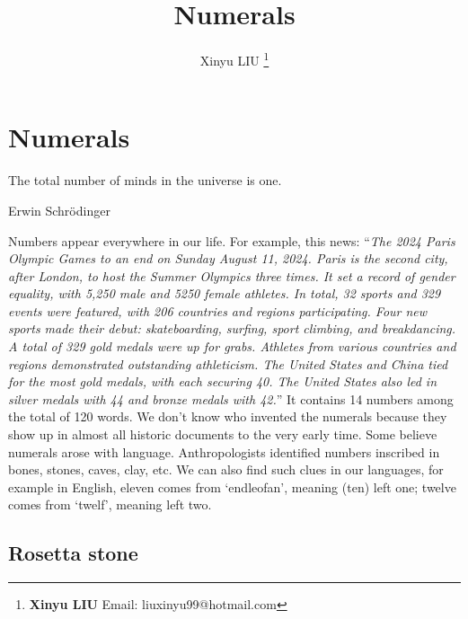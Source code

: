 \documentclass[b5paper]{article}
\begin{document}
\title{Numerals}

\author{Xinyu LIU
\thanks{{\bfseries Xinyu LIU} \newline
  Email: liuxinyu99@hotmail.com \newline}
  }

\maketitle
\fi


\ifx\wholebook\relax
\chapter{Numerals}
\fi

\epigraph{The total number of minds in the universe is one.}{Erwin Schrödinger}

Numbers appear everywhere in our life. For example, this news: \enquote{\textit{The 2024 Paris Olympic Games to an end on Sunday August 11, 2024. Paris is the second city, after London, to host the Summer Olympics three times. It set a record of gender equality, with 5,250 male and 5250 female athletes. In total, 32 sports and 329 events were featured, with 206 countries and regions participating. Four new sports made their debut: skateboarding, surfing, sport climbing, and breakdancing. A total of 329 gold medals were up for grabs. Athletes from various countries and regions demonstrated outstanding athleticism. The United States and China tied for the most gold medals, with each securing 40. The United States also led in silver medals with 44 and bronze medals with 42.}} It contains 14 numbers among the total of 120 words. We don't know who invented the numerals because they show up in almost all historic documents to the very early time. Some believe numerals arose with language. Anthropologists identified numbers inscribed in bones, stones, caves, clay, etc. We can also find such clues in our languages, for example in English, eleven comes from `endleofan', meaning (ten) left one; twelve comes from `twelf', meaning left two.

\section{Rosetta stone}
  \label{sec:rosetta-stone}
\end{document}
